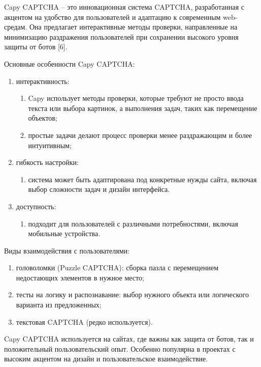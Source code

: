 Capy CAPTCHA -- это инновационная система CAPTCHA, разработанная с акцентом на 
удобство для пользователей и адаптацию к современным web-средам. Она предлагает 
интерактивные методы проверки, направленные на минимизацию раздражения 
пользователей при сохранении высокого уровня защиты от ботов [6].

Основные особенности Capy CAPTCHA:

\begin{enumerate}
    \item интерактивность:
    \begin{enumerate}
        \item Capy использует методы проверки, которые требуют не просто ввода 
        текста или выбора картинок, а выполнения задач, таких как перемещение 
        объектов;
        \item простые задачи делают процесс проверки менее раздражающим и более 
        интуитивным;
    \end{enumerate}
    \item гибкость настройки:
    \begin{enumerate}
        \item система может быть адаптирована под конкретные нужды сайта, 
        включая выбор сложности задач и дизайн интерфейса.
    \end{enumerate}
    \item доступность:
    \begin{enumerate}
        \item подходит для пользователей с различными потребностями, включая 
        мобильные устройства.
    \end{enumerate}
\end{enumerate}

Виды взаимодействия с пользователями:

\begin{enumerate}
    \item головоломки (Puzzle CAPTCHA): сборка пазла с перемещением недостающих 
    элементов в нужное место;
    \item тесты на логику и распознавание: выбор нужного объекта или 
    логического варианта из предложенных;
    \item текстовая CAPTCHA (редко используется).
\end{enumerate}

Capy CAPTCHA используется на сайтах, где важны как защита от ботов, так и 
положительный пользовательский опыт. Особенно популярна в проектах с высоким 
акцентом на дизайн и пользовательское взаимодействие.

